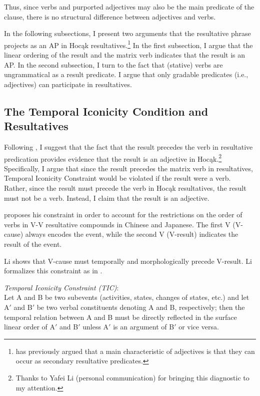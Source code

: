 \documentclass[output=paper]{LSP/langsci}
\begin{document}
Thus, since verbs and purported adjectives may also be the main predicate of the clause, there is no structural difference between adjectives and verbs.

In the following subsections, I present two arguments that the resultative phrase projects as an AP in Hocąk resultatives.\footnote{\citet{Baker2003} has previously argued that a main characteristic of adjectives is that they can occur as secondary resultative predicates.} In the first subsection, I argue that the linear ordering of the result and the matrix verb indicates that the result is an AP. In the second subsection, I turn to the fact that (stative) verbs are ungrammatical as a result predicate. I argue that only gradable predicates (i.e., adjectives) can participate in resultatives. 

\subsection{The Temporal Iconicity Condition and Resultatives}

Following \citet{Li1993}, I suggest that the fact that the result precedes the verb in resultative predication provides evidence that the result is an adjective in Hocąk.\footnote{Thanks to Yafei Li (personal communication) for bringing this diagnostic to my attention.} Specifically, I argue that since the result precedes the matrix verb in resultatives,  Temporal Iconicity Constraint would be violated if the result were a verb. Rather, since the result must precede the verb in Hocąk resultatives, the result must not be a verb. Instead, I claim that the result is an adjective.

\citet[499]{Li1993} proposes his constraint in order to account for the restrictions on the order of verbs in V-V resultative compounds in Chinese and Japanese. The first V (V-cause) always encodes the event, while the second V (V-result) indicates the result of the event. 

Li shows that V-cause must temporally and morphologically precede V-result. Li formalizes this constraint as in .

\begin{exe}

\ex\label{ex:rosen:32}
 \emph{Temporal Iconicity Constraint (TIC)}:\\
 Let A and B be two subevents (activities, states, changes of states, etc.) and let A$'$ and B$'$ be two verbal constituents denoting A and B, respectively; then the temporal relation between A and B must be directly reflected in the surface linear order of A$'$ and B$'$ unless A$'$ is an argument of B$'$ or vice versa.
 
 \end{exe}
\end{document}
